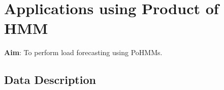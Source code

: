 \documentclass[conference]{IEEEtran}
\begin{document}

\section{Applications using Product of HMM}
\label{poc}

\textbf{Aim}: To perform load forecasting using PoHMMs.

\subsection{Data Description} 
\end{document}
